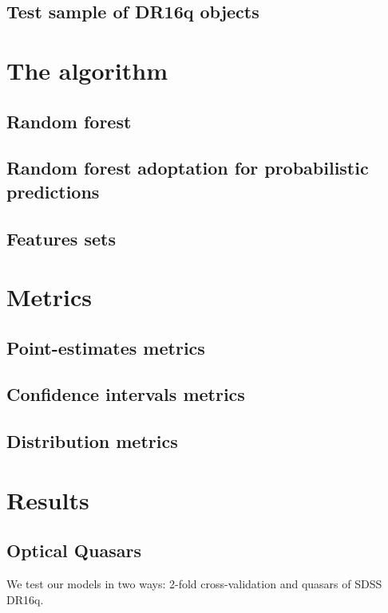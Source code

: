 \documentclass[fleqn,usenatbib]{mnras}
\begin{document}
\subsection{Test sample of DR16q objects}


\section{The algorithm}
\subsection{Random forest}
\subsection{Random forest adoptation for probabilistic predictions}
\subsection{Features sets}


\section{Metrics}
\subsection{Point-estimates metrics}
\subsection{Confidence intervals metrics}
\subsection{Distribution metrics}


\section{Results}
\subsection{Optical Quasars}
We test our models in two ways: 2-fold cross-validation and quasars of SDSS DR16q.
\end{document}

